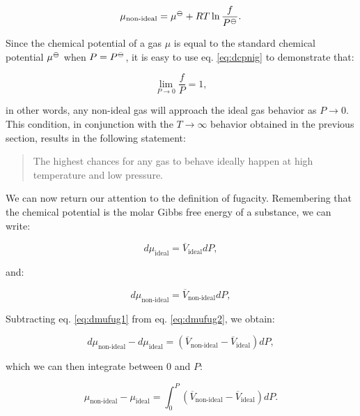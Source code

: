 \documentclass[
  9pt,
]{extbook}
\theoremstyle{definition}
\theoremstyle{definition}
\theoremstyle{definition}
\theoremstyle{remark}
\begin{document}
\begin{equation}
\mu_{\text{non-ideal}} = \mu^{-\kern-6pt{\ominus}\kern-6pt-}+ RT \ln \frac{f}{P^{-\kern-6pt{\ominus}\kern-6pt-}}.
\label{eq:dcpnig}
\end{equation}

Since the chemical potential of a gas \(\mu\) is equal to the standard chemical potential \(\mu^{-\kern-6pt{\ominus}\kern-6pt-}\) when \(P=P^{-\kern-6pt{\ominus}\kern-6pt-}\), it is easy to use eq. \eqref{eq:dcpnig} to demonstrate that:

\begin{equation}
\lim_{P\rightarrow 0} \frac{f}{P} = 1,
\label{eq:dcpnigL}
\end{equation}

in other words, any non-ideal gas will approach the ideal gas behavior as \(P\rightarrow 0\). This condition, in conjunction with the \(T\rightarrow \infty\) behavior obtained in the previous section, results in the following statement:

\begin{quote}
The highest chances for any gas to behave ideally happen at high temperature and low pressure.
\end{quote}

We can now return our attention to the definition of fugacity. Remembering that the chemical potential is the molar Gibbs free energy of a substance, we can write:

\begin{equation}
d \mu_{\text{ideal}} = \overline{V}_{\text{ideal}}dP,
\label{eq:dmufug1}
\end{equation}

and:

\begin{equation}
d \mu_{\text{non-ideal}} = \overline{V}_{\text{non-ideal}}dP,
\label{eq:dmufug2}
\end{equation}

Subtracting eq. \eqref{eq:dmufug1} from eq. \eqref{eq:dmufug2}, we obtain:

\begin{equation}
d \mu_{\text{non-ideal}}-d \mu_{\text{ideal}} = \left(\overline{V}_{\text{non-ideal}}-\overline{V}_{\text{ideal}} \right) dP,
\label{eq:dmufug3}
\end{equation}

which we can then integrate between \(0\) and \(P\):

\begin{equation}
\mu_{\text{non-ideal}}-\mu_{\text{ideal}} = \int_0^P \left(\overline{V}_{\text{non-ideal}}-\overline{V}_{\text{ideal}} \right) dP.
\label{eq:dmufug4}
\end{equation}
\end{document}
